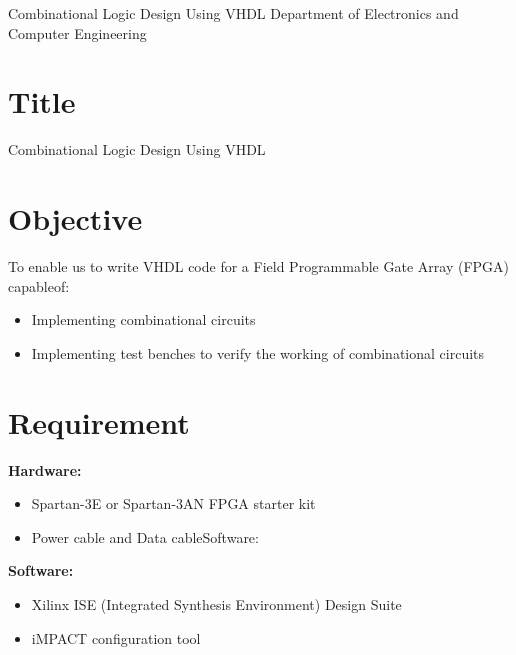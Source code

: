 \documentclass{article}
\begin{document}
{Combinational Logic Design Using VHDL}
{Department of Electronics and Computer Engineering}




\tableofcontents
\pagebreak
\listoffigures
\pagebreak
\lstlistoflistings
\pagebreak
{}


\section{Title} {\large Combinational Logic Design Using VHDL}
\section{Objective}
To enable us to write VHDL code for a Field Programmable Gate Array (FPGA) capableof:
\begin{itemize}
    \item Implementing combinational circuits
    \item Implementing test benches to verify the working of combinational circuits

\end{itemize}
\section{Requirement}

\textbf{Hardware:}

\begin{itemize}
    \item Spartan-3E or Spartan-3AN FPGA starter kit
    \item Power cable and Data cableSoftware:
\end{itemize}


\textbf{Software:}

\begin{itemize}
    \item Xilinx ISE (Integrated Synthesis Environment) Design Suite
    \item iMPACT configuration tool
\end{itemize}
\end{document}
